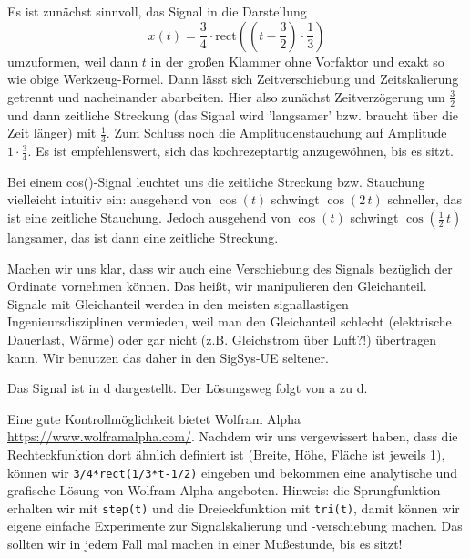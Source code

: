 \begin{Ansatz}
Es ist zunächst sinnvoll, das Signal in die Darstellung
\begin{equation}
x(t) = \frac{3}{4} \cdot \mathrm{rect}(\left(t-\frac{3}{2}\right)\cdot \frac{1}{3})
\end{equation}
umzuformen, weil dann $t$ in der großen Klammer ohne Vorfaktor und exakt so wie
obige Werkzeug-Formel.
Dann lässt sich Zeitverschiebung und Zeitskalierung
getrennt und nacheinander abarbeiten. Hier also zunächst Zeitverzögerung um
$\frac{3}{2}$ und dann zeitliche Streckung (das Signal wird 'langsamer' bzw.
braucht über die Zeit länger) mit $\frac{1}{3}$.
%
Zum Schluss noch die Amplitudenstauchung auf Amplitude $1 \cdot \frac{3}{4}$.
%
Es ist empfehlenswert, sich das kochrezeptartig anzugewöhnen, bis es sitzt.

Bei einem cos()-Signal leuchtet uns die zeitliche Streckung bzw. Stauchung vielleicht
intuitiv ein: ausgehend von $\cos(t)$ schwingt $\cos(2\,t)$ schneller, das ist eine
zeitliche Stauchung.
%
Jedoch ausgehend von $\cos(t)$ schwingt $\cos(\frac{1}{2}\,t)$
langsamer, das ist dann eine zeitliche Streckung.

Machen wir uns klar, dass wir auch eine Verschiebung des Signals bezüglich der
Ordinate vornehmen können. Das heißt, wir manipulieren den Gleichanteil.
%
Signale mit Gleichanteil werden in den meisten signallastigen
Ingenieursdisziplinen vermieden, weil man den Gleichanteil schlecht
(elektrische Dauerlast, Wärme) oder gar nicht (z.B. Gleichstrom über Luft?!)
übertragen kann.
%
Wir benutzen das daher in den SigSys-UE seltener.

\end{Ansatz}
\begin{Loesung}
Das Signal ist in d dargestellt. Der Lösungsweg folgt von
a zu d.

Eine gute Kontrollmöglichkeit bietet Wolfram Alpha
\url{https://www.wolframalpha.com/}.
Nachdem wir uns vergewissert haben, dass die Rechteckfunktion dort ähnlich definiert
ist (Breite, Höhe, Fläche ist jeweils 1), können wir
\verb|3/4*rect(1/3*t-1/2)| eingeben und bekommen eine analytische und grafische
Lösung von Wolfram Alpha angeboten.
Hinweis: die Sprungfunktion erhalten wir mit \verb|step(t)|
und die Dreieckfunktion mit \verb|tri(t)|, damit können wir eigene einfache
Experimente zur Signalskalierung und -verschiebung machen.
%
Das sollten wir in jedem Fall mal machen in einer Mußestunde, bis es sitzt!

\end{Loesung}

